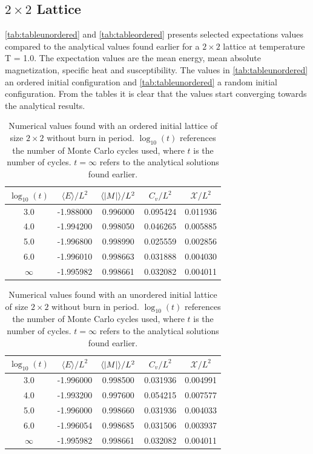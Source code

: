 \documentclass[%
reprint,
nofootinbib,
amsmath,amssymb,
aps,
]{revtex4-1}
\begin{document}
\subsection{$2\times 2$ Lattice} %
\autoref{tab:tableunordered} and \autoref{tab:tableordered} presents selected expectations values compared to the analytical values found earlier for a $2\times 2$ lattice at \texttt{}temperature T = 1.0. The expectation values are the mean energy, mean absolute magnetization, specific heat and susceptibility. The values in \autoref{tab:tableunordered} an ordered initial configuration and \autoref{tab:tableunordered} a random initial configuration. From the tables it is clear that the values start converging towards the analytical results. 
\begin{table}
	\centering
	\caption{Numerical values found with an ordered initial lattice of size $2\times 2$ without burn in period. $\log_{10}(t)$ references the number of Monte Carlo cycles used, where $t$ is the number of cycles. $ t = \infty$ refers to the analytical solutions found earlier.}
	\label{tab:tableordered}
	\begin{tabular}{|c|c|c|c|c|}
		\hline
		$\log_{10}(t)$ & $\langle E \rangle / L^2$ & $\langle \abs{M}\rangle / L^2$ & $C_v/L^2$ & $\mathcal{X}/L^2$\\
		\hline
		3.0 & -1.988000 &0.996000 &0.095424 &0.011936 \\
		4.0 & -1.994200 &0.998050 &0.046265 &0.005885 \\
		5.0 & -1.996800 &0.998990 &0.025559 &0.002856 \\
		6.0 & -1.996010 &0.998663 &0.031888 &0.004030 \\
		\hline
		$\infty$& -1.995982 & 0.998661 & 0.032082 & 0.004011\\
		\hline
	\end{tabular}
\end{table}
\begin{table}
	\centering
	\caption{Numerical values found with an unordered initial lattice of size $2\times 2$ without burn in period. $\log_{10}(t)$ references the number of Monte Carlo cycles used, where $t$ is the number of cycles. $ t = \infty$ refers to the analytical solutions found earlier.}
	\label{tab:tableunordered}
	\begin{tabular}{|c|c|c|c|c|}
		\hline
		$\log_{10}(t)$ & $\langle E \rangle / L^2$ & $\langle \abs{M}\rangle / L^2$ & $C_v/L^2$ & $\mathcal{X}/L^2$\\
		\hline
		3.0 & -1.996000 &0.998500 &0.031936 &0.004991 \\
		4.0 & -1.993200 &0.997600 &0.054215 &0.007577 \\
		5.0 & -1.996000 &0.998660 &0.031936 &0.004033 \\
		6.0 & -1.996054 &0.998685 &0.031506 &0.003937 \\
		\hline
		$\infty$& -1.995982 & 0.998661 & 0.032082 & 0.004011\\
		\hline
	\end{tabular}
\end{table}
\end{document}
